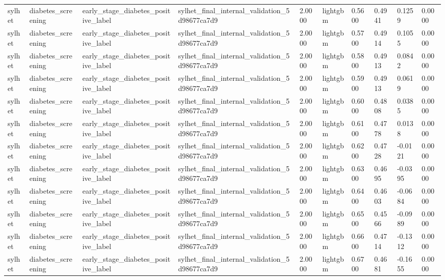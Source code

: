 \begin{tabular}{llllllllll}
sylhet & diabetes\_screening & early\_stage\_diabetes\_positive\_label & sylhet\_final\_internal\_validation\_5d98677ca7d9 & 2.0000 & lightgbm & 0.5600 & 0.4941 & 0.1259 & 0.0000 \\
sylhet & diabetes\_screening & early\_stage\_diabetes\_positive\_label & sylhet\_final\_internal\_validation\_5d98677ca7d9 & 2.0000 & lightgbm & 0.5700 & 0.4914 & 0.1055 & 0.0000 \\
sylhet & diabetes\_screening & early\_stage\_diabetes\_positive\_label & sylhet\_final\_internal\_validation\_5d98677ca7d9 & 2.0000 & lightgbm & 0.5800 & 0.4913 & 0.0842 & 0.0000 \\
sylhet & diabetes\_screening & early\_stage\_diabetes\_positive\_label & sylhet\_final\_internal\_validation\_5d98677ca7d9 & 2.0000 & lightgbm & 0.5900 & 0.4913 & 0.0619 & 0.0000 \\
sylhet & diabetes\_screening & early\_stage\_diabetes\_positive\_label & sylhet\_final\_internal\_validation\_5d98677ca7d9 & 2.0000 & lightgbm & 0.6000 & 0.4808 & 0.0385 & 0.0000 \\
sylhet & diabetes\_screening & early\_stage\_diabetes\_positive\_label & sylhet\_final\_internal\_validation\_5d98677ca7d9 & 2.0000 & lightgbm & 0.6100 & 0.4778 & 0.0138 & 0.0000 \\
sylhet & diabetes\_screening & early\_stage\_diabetes\_positive\_label & sylhet\_final\_internal\_validation\_5d98677ca7d9 & 2.0000 & lightgbm & 0.6200 & 0.4728 & -0.0121 & 0.0000 \\
sylhet & diabetes\_screening & early\_stage\_diabetes\_positive\_label & sylhet\_final\_internal\_validation\_5d98677ca7d9 & 2.0000 & lightgbm & 0.6300 & 0.4695 & -0.0395 & 0.0000 \\
sylhet & diabetes\_screening & early\_stage\_diabetes\_positive\_label & sylhet\_final\_internal\_validation\_5d98677ca7d9 & 2.0000 & lightgbm & 0.6400 & 0.4603 & -0.0684 & 0.0000 \\
sylhet & diabetes\_screening & early\_stage\_diabetes\_positive\_label & sylhet\_final\_internal\_validation\_5d98677ca7d9 & 2.0000 & lightgbm & 0.6500 & 0.4566 & -0.0989 & 0.0000 \\
sylhet & diabetes\_screening & early\_stage\_diabetes\_positive\_label & sylhet\_final\_internal\_validation\_5d98677ca7d9 & 2.0000 & lightgbm & 0.6600 & 0.4714 & -0.1312 & 0.0000 \\
sylhet & diabetes\_screening & early\_stage\_diabetes\_positive\_label & sylhet\_final\_internal\_validation\_5d98677ca7d9 & 2.0000 & lightgbm & 0.6700 & 0.4681 & -0.1655 & 0.0000 \\

\end{tabular}
